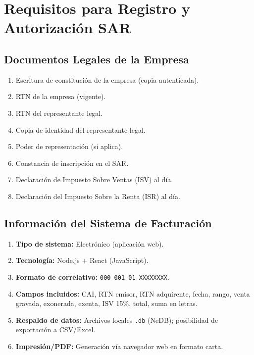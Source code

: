\documentclass[12pt, letterpaper]{article}
\begin{document}
\section{Requisitos para Registro y Autorización SAR}

\subsection{Documentos Legales de la Empresa}

\begin{enumerate}[label=\textbf{\arabic*.}]
  \item Escritura de constitución de la empresa (copia autenticada).
  \item RTN de la empresa (vigente).
  \item RTN del representante legal.
  \item Copia de identidad del representante legal.
  \item Poder de representación (si aplica).
  \item Constancia de inscripción en el SAR.
  \item Declaración de Impuesto Sobre Ventas (ISV) al día.
  \item Declaración del Impuesto Sobre la Renta (ISR) al día.
\end{enumerate}

\subsection{Información del Sistema de Facturación}

\begin{enumerate}[label=\textbf{\arabic*.}]
  \item \textbf{Tipo de sistema:} Electrónico (aplicación web).
  \item \textbf{Tecnología:} Node.js + React (JavaScript).
  \item \textbf{Formato de correlativo:} \texttt{000-001-01-XXXXXXXX}.
  \item \textbf{Campos incluidos:} CAI, RTN emisor, RTN adquirente,
        fecha, rango, venta gravada, exonerada, exenta, ISV 15\%,
        total, suma en letras.
  \item \textbf{Respaldo de datos:} Archivos locales \texttt{.db}
        (NeDB); posibilidad de exportación a CSV/Excel.
  \item \textbf{Impresión/PDF:} Generación vía navegador web en
        formato carta.
\end{enumerate}
\end{document}
